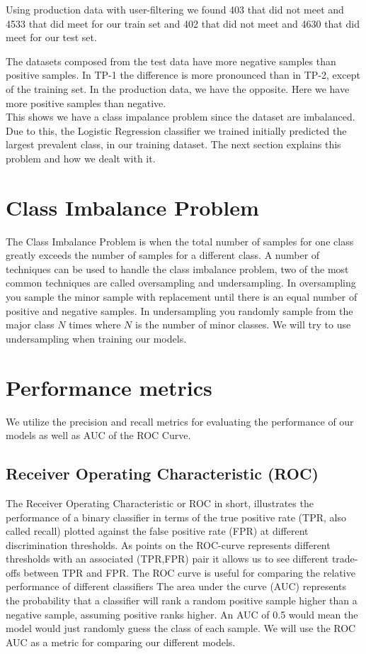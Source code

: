 Using production data with user-filtering we found 403 that did not meet and 4533 that did meet for our train set and 402 that did not meet and 4630 that did meet for our test set.

The datasets composed from the test data have more negative samples than positive samples. In TP-1 the difference is more pronounced than in TP-2, except of the training set. In the production data, we have the opposite. Here we have more positive samples than negative. \\
This shows we have a class impalance problem since the dataset are imbalanced. Due to this, the Logistic Regression classifier we trained initially predicted the largest prevalent class, in our training dataset. The next section explains this problem and how we dealt with it. 


\section{Class Imbalance Problem}
\label{sec:class_imbalance_problem}
The Class Imbalance Problem is when the total number of samples for one class greatly exceeds the number of samples for a different class. A number of techniques can be used to handle the class imbalance problem, two of the most common techniques are called oversampling and undersampling\cite{tan2006introduction}. In oversampling you sample the minor sample with replacement until there is an equal number of positive and negative samples. In undersampling you randomly sample from the major class $N$ times where $N$ is the number of minor classes. We will try to use undersampling when training our models.

\section{Performance metrics}
\label{sec:performance_metrics}
We utilize the precision and recall metrics for evaluating the performance of our models as well as AUC of the ROC Curve.

\subsection{Receiver Operating Characteristic (ROC)}
The Receiver Operating Characteristic or ROC in short, illustrates the performance of a binary classifier in terms of the true positive rate (TPR, also called recall) plotted against the false positive rate (FPR) at different discrimination thresholds. As points on the ROC-curve represents different thresholds with an associated (TPR,FPR) pair it allows us to see different trade-offs between TPR and FPR. The ROC curve is useful for comparing the relative performance of different classifiers\cite{tan2006introduction} The area under the curve (AUC) represents the probability that a classifier will rank a random positive sample higher than a negative sample, assuming positive ranks higher. An AUC of 0.5 would mean the model would just randomly guess the class of each sample. We will use the ROC AUC as a metric for comparing our different models.

